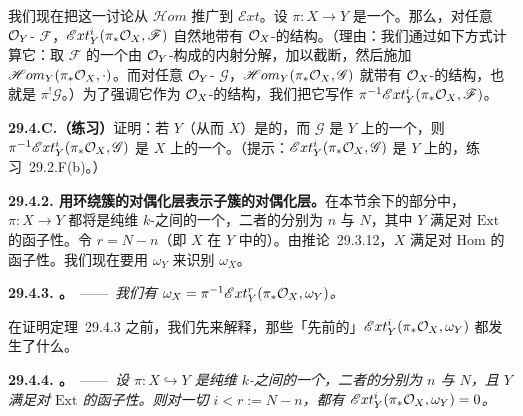 我们现在把这一讨论从 $\mathscr{H}om$ 推广到 $\mathscr{E}xt$。设 $\pi\colon X\to Y$ 是一个\trClosedEmbedding。那么，对任意 $\mathcal{O}_Y$-\trModule{} $\mathscr{F}$，$\mathscr{E}xt^i_Y(\pi_*\mathcal{O}_X,\mathscr{F})$ 自然地带有 $\mathcal{O}_X$-\trModule{}的结构。（理由：我们通过如下方式计算它：取 $\mathscr{F}$ 的一个由 $\mathcal{O}_Y$-\trModule{}构成的内射分解，加以截断，然后施加 $\mathscr{H}om_Y(\pi_*\mathcal{O}_X,\cdot)$。而对任意 $\mathcal{O}_Y$-\trModule{} $\mathscr{G}$，$\mathscr{H}om_Y(\pi_*\mathcal{O}_X,\mathscr{G})$ 就带有 $\mathcal{O}_X$-\trModule{}的结构，也就是 $\pi^!\mathscr{G}$。）为了强调它作为 $\mathcal{O}_X$-\trModule{}的结构，我们把它写作 $\pi^{-1}\mathscr{E}xt^i_Y(\pi_*\mathcal{O}_X,\mathscr{F})$。

\textbf{29.4.C.（练习）}\quad 证明：若 $Y$（从而 $X$）是\trLocally\trNoetherian{}的，而 $\mathscr{G}$ 是 $Y$ 上的一个\trCoherentSheaf，则 $\pi^{-1}\mathscr{E}xt^i_Y(\pi_*\mathcal{O}_X,\mathscr{G})$ 是 $X$ 上的一个\trCoherentSheaf。（提示：$\mathscr{E}xt^i_Y(\pi_*\mathcal{O}_X,\mathscr{G})$ 是 $Y$ 上的\trCoherentSheaf，\mbox{练习~29.2.F(b)}。）

\textbf{29.4.2. 用环绕簇的对偶化层表示子簇的对偶化层。}\quad 在本节余下的部分中，$\pi\colon X\to Y$ 都将是纯维\trProjective{} $k$-\trScheme{}之间的一个\trClosedEmbedding，二者的\trDimension{}分别为 $n$ 与 $N$，其中 $Y$ 满足对 $\mathrm{Ext}$ 的函子性\trSerreDuality。令 $r=N-n$（即 $X$ 在 $Y$ 中的\trCodimension）。由\mbox{推论~29.3.12}，$X$ 满足对 $\mathrm{Hom}$ 的函子性\trSerreDuality。我们现在要用 $\omega_Y$ 来识别 $\omega_X$。

\textbf{29.4.3. \trhTheorem。}\ ——\ \emph{我们有 $\omega_X=\pi^{-1}\mathscr{E}xt^r_Y(\pi_*\mathcal{O}_X,\omega_Y)$。}

在证明\mbox{定理~29.4.3} 之前，我们先来解释，那些「先前的」$\mathscr{E}xt^i_Y(\pi_*\mathcal{O}_X,\omega_Y)$ 都发生了什么。

\textbf{29.4.4. \trhProposition。}\ ——\ \emph{设 $\pi\colon X\hookrightarrow Y$ 是纯维\trProjective{} $k$-\trScheme{}之间的一个\trClosedEmbedding，二者的\trDimension{}分别为 $n$ 与 $N$，且 $Y$ 满足对 $\mathrm{Ext}$ 的函子性\trSerreDuality。则对一切 $i<r:=N-n$，都有 $\mathscr{E}xt^i_Y(\pi_*\mathcal{O}_X,\omega_Y)=0$。}

